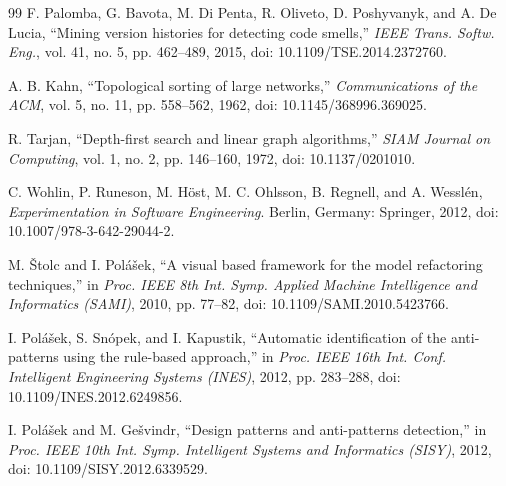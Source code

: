 \documentclass[journal,onecolumn,11pt]{IEEEtran}
\begin{document}
\begin{thebibliography}{99}
 F. Palomba, G. Bavota, M. Di Penta, R. Oliveto, D. Poshyvanyk, and A. De Lucia, ``Mining version histories for detecting code smells,'' \emph{IEEE Trans. Softw. Eng.}, vol. 41, no. 5, pp. 462--489, 2015, doi: 10.1109/TSE.2014.2372760.

 A. B. Kahn, ``Topological sorting of large networks,'' \emph{Communications of the ACM}, vol. 5, no. 11, pp. 558--562, 1962, doi: 10.1145/368996.369025.

 R. Tarjan, ``Depth-first search and linear graph algorithms,'' \emph{SIAM Journal on Computing}, vol. 1, no. 2, pp. 146--160, 1972, doi: 10.1137/0201010.

 C. Wohlin, P. Runeson, M. H\"ost, M. C. Ohlsson, B. Regnell, and A. Wessl\'en, \emph{Experimentation in Software Engineering}. Berlin, Germany: Springer, 2012, doi: 10.1007/978-3-642-29044-2.

 M. \v{S}tolc and I. Pol\'a\v{s}ek, ``A visual based framework for the model refactoring techniques,'' in \emph{Proc. IEEE 8th Int. Symp. Applied Machine Intelligence and Informatics (SAMI)}, 2010, pp. 77--82, doi: 10.1109/SAMI.2010.5423766.

 I. Pol\'a\v{s}ek, S. Sn\'opek, and I. Kapustik, ``Automatic identification of the anti-patterns using the rule-based approach,'' in \emph{Proc. IEEE 16th Int. Conf. Intelligent Engineering Systems (INES)}, 2012, pp. 283--288, doi: 10.1109/INES.2012.6249856.

 I. Pol\'a\v{s}ek and M. Ge\v{s}vindr, ``Design patterns and anti-patterns detection,'' in \emph{Proc. IEEE 10th Int. Symp. Intelligent Systems and Informatics (SISY)}, 2012, doi: 10.1109/SISY.2012.6339529.
\end{thebibliography}
\end{document}
